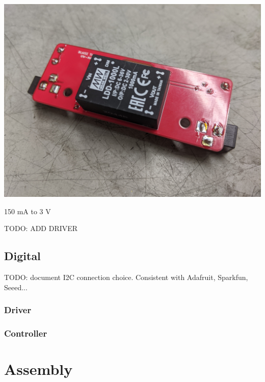\documentclass[11pt]{article}
\let\stdsection\section
\renewcommand\section{\clearpage\stdsection}
\begin{document}
\begin{center}
  \includegraphics[width=\textwidth/2]{"./pcb-driver.jpg"}
\end{center}

150 mA to 3 V

TODO: ADD DRIVER



\subsection{Digital}

TODO: document I2C connection choice.
Consistent with Adafruit, Sparkfun, Seeed...

\subsubsection{Driver}



\subsubsection{Controller}

\section{Assembly}
\end{document}
